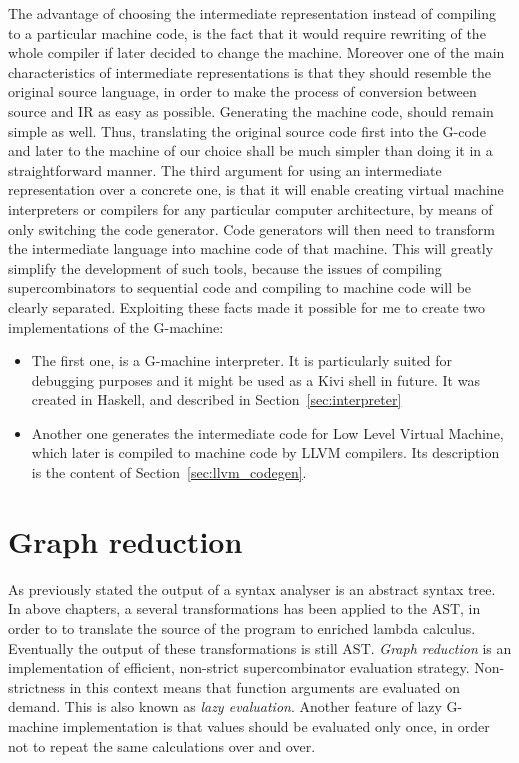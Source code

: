 \documentclass[12pt,a4paper]{report}
\begin{document}
The advantage of choosing the intermediate representation instead of compiling
to a particular machine code, is the fact that it would require rewriting of
the whole compiler if later decided to change the machine. Moreover one of the
main characteristics of intermediate representations is that they should
resemble the original source language, in order to make the process of
conversion between source and IR as easy as possible. Generating the machine
code, should remain simple as well. Thus, translating the original source code
first into the G-code and later to the machine of our choice shall be much
simpler than doing it in a straightforward manner. The third argument for
using an intermediate representation over a concrete one, is that it will
enable creating virtual machine interpreters or compilers for any particular
computer architecture, by means of only switching the code generator. Code
generators will then need to transform the intermediate language into machine
code of that machine. This will greatly simplify the development of such tools,
because the issues of compiling supercombinators to sequential code and
compiling to machine code will be clearly separated. Exploiting these facts
made it possible for me to create two implementations of the G-machine:

\begin{itemize}
  \item The first one, is a G-machine interpreter. It is particularly suited
    for debugging purposes and it might be used as a Kivi shell in future. It
    was created in Haskell, and described in Section~\ref{sec:interpreter}
  \item Another one generates the intermediate code for Low Level Virtual
    Machine, which later is compiled to machine code by LLVM compilers. Its
    description is the content of Section~\ref{sec:llvm_codegen}.
\end{itemize}

\section{Graph reduction}
\label{sec:graph_reduction}
As previously stated the output of a syntax analyser is an abstract syntax
tree. In above chapters, a several transformations has been applied to the AST,
in order to to translate the source of the program to enriched lambda calculus.
Eventually the output of these transformations is still AST. \textit{Graph
reduction} is an implementation of efficient, non-strict supercombinator
evaluation strategy.  Non-strictness in this context means that function
arguments are evaluated on demand. This is also known as \textit{lazy
evaluation}. Another feature of lazy G-machine implementation is that values
should be evaluated only once, in order not to repeat the same calculations
over and over.
\end{document}
